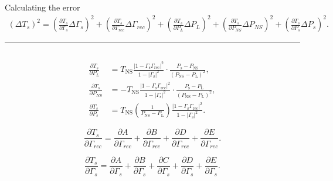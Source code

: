 \documentclass[aspectratio=169]{beamer}
\begin{document}
\begin{frame}{Calculating the error}
	\vfill
	{\tiny
		\begin{multline}
			(\Delta T_s)^2 =
			\left(\frac{\partial T_s}{\partial \Gamma_s} \Delta \Gamma_s\right)^2 +
			\left(\frac{\partial T_s}{\partial \Gamma_{rec}} \Delta \Gamma_{rec}\right)^2 +
			\left(\frac{\partial T_s}{\partial P_L} \Delta P_L\right)^2 +
			\left(\frac{\partial T_s}{\partial P_{NS}} \Delta P_{NS}\right)^2 +
			\left(\frac{\partial T_s}{\partial P_s} \Delta P_s\right)^2.
		\end{multline}
	}

	\hrule

	\begin{columns}[c] %
		\begin{column}{0.4\textwidth}
			\centering
			{\tiny
				\begin{align}
					\frac{\partial T_s}{\partial P_L}    & = T_\mathrm{NS} \frac{\left|1 - \Gamma_\mathrm{s} \Gamma_\mathrm{rec}\right|^2}{1 - |\Gamma_\mathrm{s}|^2} \cdot \frac{P_\mathrm{s} - P_\mathrm{NS}}{(P_\mathrm{NS} - P_\mathrm{L})^2}, \\
					\frac{\partial T_s}{\partial P_{NS}} & = -T_\mathrm{NS} \frac{\left|1 - \Gamma_\mathrm{s} \Gamma_\mathrm{rec}\right|^2}{1 - |\Gamma_\mathrm{s}|^2} \cdot \frac{P_\mathrm{s} - P_\mathrm{L}}{(P_\mathrm{NS} - P_\mathrm{L})^2}, \\
					\frac{\partial T_s}{\partial P_s}    & = T_\mathrm{NS} \left(\frac{1}{P_\mathrm{NS}-P_\mathrm{L}}\right) \frac{\left|1-\Gamma_\mathrm{s}\Gamma_\mathrm{rec}\right|^2}{ 1-|\Gamma_\mathrm{s}|^2}.
				\end{align}

				\begin{equation}
					\frac{\partial T_s}{\partial \Gamma_{rec}} = \frac{\partial A}{\partial \Gamma_{rec}} + \frac{\partial B}{\partial \Gamma_{rec}} + \frac{\partial D}{\partial \Gamma_{rec}} + \frac{\partial E}{\partial \Gamma_{rec}}.
				\end{equation}

				\begin{equation}
					\frac{\partial T_s}{\partial \Gamma_s} = \frac{\partial A}{\partial \Gamma_s} + \frac{\partial B}{\partial \Gamma_s} + \frac{\partial C}{\partial \Gamma_s} + \frac{\partial D}{\partial \Gamma_s} + \frac{\partial E}{\partial \Gamma_s}.
				\end{equation}
			}
		\end{column}


\end{columns}
\end{frame}
\end{document}
